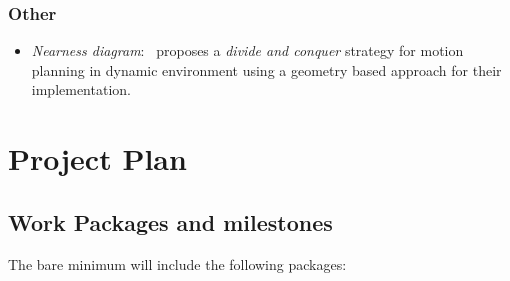 \documentclass[rnd]{mas_proposal}
\begin{document}
\subsection{Other}
\begin{itemize}
    \item \textit{Nearness diagram}:~\cite{minguez2004nearness} proposes a \textit{divide and conquer} strategy for motion planning in dynamic environment using a geometry based approach for their implementation.
\end{itemize}


\chapter{Project Plan}

\section{Work Packages and milestones}
The bare minimum will include the following packages:
\end{document}
